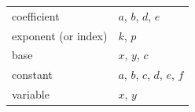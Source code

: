 {\begin{center}
\begin{xtabular*}{\mytablewidth}[t]{|p{10\mystarwidth}|p{10\mystarwidth}|}
        coefficient &
        $a$, $b$, $d$, $e$%
     \tabularnewline{}
        exponent (or index) &
        $k$, $p$%
     \tabularnewline{}
        base &
        $x$, $y$, $c$%
     \tabularnewline{}
        constant &
        $a$, $b$, $c$, $d$, $e$, $f$%
     \tabularnewline{}
        variable &
        $x$, $y$%
     \tabularnewline{}

\end{xtabular*}
\end{center}}
